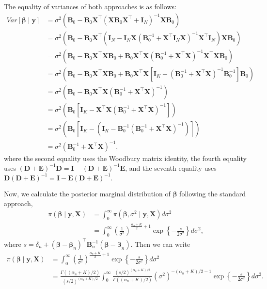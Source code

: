 The equality of variances of both approaches is as follows:
\begin{align*}
		Var[\bm{\beta}\mid \bm{y}]&
		= \sigma^2(\bm{B}_{0}-\bm{B}_{0}\bm{X}^{\top}(\bm{X}\bm{B}_{0}\bm{X}^\top+\bm{I}_N)^{-1} \bm{X}\bm{B}_{0})\\
		&=\sigma^2(\bm{B}_{0}-\bm{B}_{0}\bm{X}^{\top}(\bm{I}_N- \bm{I}_N\bm{X}(\bm{B}_{0}^{-1}+\bm{X}^{\top}\bm{I}_N\bm{X})^{-1}\bm{X}^{\top}\bm{I}_N)\bm{X}\bm{B}_{0})\\
		&=\sigma^2(\bm{B}_{0}-\bm{B}_{0}\bm{X}^{\top}\bm{X}\bm{B}_{0}+ \bm{B}_{0}\bm{X}^{\top}\bm{X}(\bm{B}_{0}^{-1}+\bm{X}^{\top}\bm{X})^{-1}\bm{X}^{\top}\bm{X}\bm{B}_{0})\\
		&=\sigma^2(\bm{B}_{0}-\bm{B}_{0}\bm{X}^{\top}\bm{X}\bm{B}_{0}+ \bm{B}_{0}\bm{X}^{\top}\bm{X}[\bm{I}_K-(\bm{B}_{0}^{-1}+\bm{X}^{\top}\bm{X})^{-1}\bm{B}_{0}^{-1}]\bm{B}_{0})\\
		&=\sigma^2(\bm{B}_{0}-\bm{B}_{0}\bm{X}^{\top}\bm{X}(\bm{B}_{0}^{-1}+\bm{X}^{\top}\bm{X})^{-1})\\
		&=\sigma^2(\bm{B}_{0}[\bm{I}_K-\bm{X}^{\top}\bm{X}(\bm{B}_{0}^{-1}+\bm{X}^{\top}\bm{X})^{-1}])\\
		&=\sigma^2(\bm{B}_{0}[\bm{I}_K-(\bm{I}_K-\bm{B}_{0}^{-1}(\bm{B}_{0}^{-1}+\bm{X}^{\top}\bm{X})^{-1})])\\
		&=\sigma^2(\bm{B}_{0}^{-1}+\bm{X}^{\top}\bm{X})^{-1},
\end{align*}
where the second equality uses the Woodbury matrix identity, the fourth equality uses $(\bm{D}+\bm{E})^{-1}\bm{D}=\bm{I}-(\bm{D}+\bm{E})^{-1}\bm{E}$, and the seventh equality uses $\bm{D}(\bm{D}+\bm{E})^{-1}=\bm{I}-\bm{E}(\bm{D}+\bm{E})^{-1}$.  

Now, we calculate the posterior marginal distribution of $\bm{\beta}$ following the standard approach,
\begin{align*}
	\pi(\bm{\beta}\mid {\bm{y}},{\bm{X}}) & = \int_0^{\infty} \pi(\bm{\beta}, \sigma^2\mid {\bm{y}},{\bm{X}}) d\sigma^2 \\
	& = \int_0^{\infty} \left(\frac{1}{\sigma^2}\right)^{\frac{\alpha_n+K}{2} + 1} \exp \left\{-\frac{s}{2\sigma^2}\right\} d\sigma^2,
\end{align*}
where $s = \delta_n + (\bm{\beta} - \bm{\beta}_n)^{\top}{{\bm{B}}}_n^{-1}(\bm{\beta} - \bm{\beta}_n)$. Then we can write
\begin{align*}
	\pi(\bm{\beta}\mid {\bm{y}},{\bm{X}}) & = \int_0^{\infty} \left(\frac{1}{\sigma^2}\right)^{\frac{\alpha_n+K}{2} + 1} \exp \left\{-\frac{s}{2\sigma^2}\right\} d\sigma^2 \\
	& = \frac{\Gamma((\alpha_n+K)/2)}{(s/2)^{(\alpha_n+K)/2}} \int_0^{\infty} \frac{(s/2)^{(\alpha_n+K)/2}}{\Gamma((\alpha_n+K)/2)} (\sigma^2)^{-(\alpha_n+K)/2 - 1} \exp \left\{-\frac{s}{2\sigma^2}\right\} d\sigma^2.
\end{align*}

